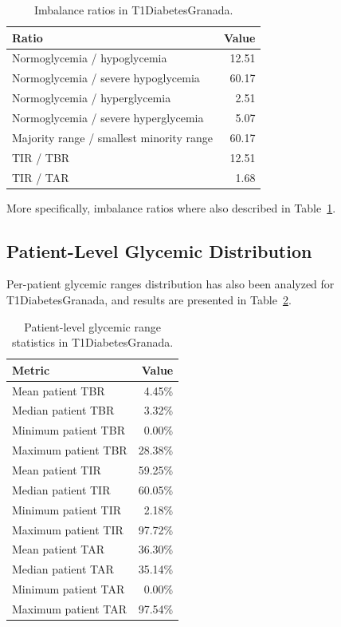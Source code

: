 \begin{table}[htbp]
    \centering
    \caption{Imbalance ratios in T1DiabetesGranada.}
    \label{tab:t1diabetesgranada_imbalance_ratios}
    \begin{tabular}{lr}
        \hline
        \textbf{Ratio} & \textbf{Value} \\
        \hline
        Normoglycemia / hypoglycemia & 12.51 \\
        Normoglycemia / severe hypoglycemia & 60.17 \\
        Normoglycemia / hyperglycemia & 2.51 \\
        Normoglycemia / severe hyperglycemia & 5.07 \\
        Majority range / smallest minority range & 60.17 \\
        \hline
        TIR / TBR & 12.51 \\
        TIR / TAR & 1.68 \\
        \hline
    \end{tabular}
\end{table}

More specifically, imbalance ratios where also described in Table~\ref{tab:t1diabetesgranada_imbalance_ratios}.

\subsection{Patient-Level Glycemic Distribution}
\label{subsec:t1diabetesgranada_patient_level}

Per-patient glycemic ranges distribution has also been analyzed for T1DiabetesGranada, and results are presented in Table~\ref{tab:t1diabetesgranada_patient_glycemic_statistics}.

\begin{table}[htbp]
    \centering
    \caption{Patient-level glycemic range statistics in T1DiabetesGranada.}
    \label{tab:t1diabetesgranada_patient_glycemic_statistics}
    \begin{tabular}{lr}
        \hline
        \textbf{Metric} & \textbf{Value} \\
        \hline
        Mean patient TBR & 4.45\% \\
        Median patient TBR & 3.32\% \\
        Minimum patient TBR & 0.00\% \\
        Maximum patient TBR & 28.38\% \\
        \hline
        Mean patient TIR & 59.25\% \\
        Median patient TIR & 60.05\% \\
        Minimum patient TIR & 2.18\% \\
        Maximum patient TIR & 97.72\% \\
        \hline
        Mean patient TAR & 36.30\% \\
        Median patient TAR & 35.14\% \\
        Minimum patient TAR & 0.00\% \\
        Maximum patient TAR & 97.54\% \\
        \hline
    \end{tabular}
\end{table}


